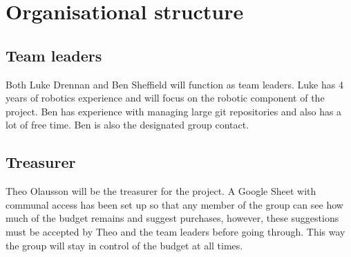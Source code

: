 \documentclass[onecolumn]{IEEEtran}
\begin{document}
\section{Organisational structure}

\subsection{Team leaders}

Both Luke Drennan and Ben Sheffield will function as team leaders. Luke has 4 years of robotics experience and will focus on the robotic component of the project. Ben has experience with managing large git repositories and also has a lot of free time. Ben is also the designated group contact.

\subsection{Treasurer}

Theo Olausson will be the treasurer for the project. A Google Sheet with communal access has been set up so that any member of the group can see how much of the budget remains and suggest purchases, however, these suggestions must be accepted by Theo and the team leaders before going through. This way the group will stay in control of the budget at all times.
\end{document}
